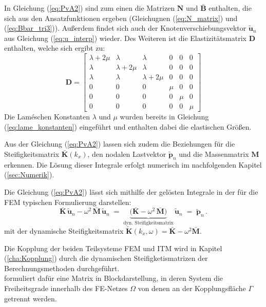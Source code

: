 In Gleichung (\ref{eq:PvA2}) sind zum einen die Matrizen $\mathbf{N}$ und $\bar{\mathbf B}$ enthalten, die sich aus den Ansatzfunktionen ergeben (Gleichugnen (\ref{eq:N_matrix}) und (\ref{eq:Bbar_tri3})). 
Außerdem findet sich auch der Knotenverschiebungsvektor $\tilde{\bm u}_{n}$ aus Gleichung (\ref{eq:u_interp}) wieder.
Des Weiteren ist die Elastizitätsmatrix $\mathbf{D}$ enthalten, welche sich ergibt zu:
\begin{equation}\label{eq:Elastizitätsmatrix}
	\mathbf D =
	\begin{bmatrix}
		\lambda+2\mu & \lambda      & \lambda      & 0 & 0 & 0 \\
		\lambda      & \lambda+2\mu & \lambda      & 0 & 0 & 0 \\
		\lambda      & \lambda      & \lambda+2\mu & 0 & 0 & 0 \\
		0            & 0            & 0            & \mu & 0   & 0 \\
		0            & 0            & 0            & 0   & \mu & 0 \\
		0            & 0            & 0            & 0   & 0   & \mu
	\end{bmatrix}
\end{equation}
Die Laméschen Konstanten $\lambda$ und $\mu$ wurden bereits in Gleichung (\ref{eq:lame_konstanten}) eingeführt und enthalten dabei die elastischen Größen.


Aus der Gleichung (\ref{eq:PvA2}) lassen sich zudem die Beziehungen für die Steifigkeitsmatrix \(\bar{\mathbf{K}}(k_x)\), den nodalen Lastvektor $\tilde{\mathbf p}_{n}$ und die Massenmatrix \(\mathbf{M}\) erkennen. 
Die Lösung dieser Integrale erfolgt numerisch im nachfolgenden Kapitel (\ref{sec:Numerik}).

Die Gleichung (\ref{eq:PvA2}) lässt sich mithilfe der gelösten Integrale in der für die FEM typischen Formulierung darstellen:
\begin{equation}\label{eq:PvA_FEM}
	\bar{\mathbf K}\,\tilde{\mathbf u}_{n}
	- \omega^{2}\,\bar{\mathbf M}\,\tilde{\mathbf u}_{n}
	\;=\;
	\underbrace{\bigl(\bar{\mathbf K}-\omega^{2}\,\bar{\mathbf M}\bigr)}_{\text{dyn.\ Steifigkeitsmatrix}}\,
	\tilde{\mathbf u}_{n}
	\;=\; \tilde{\mathbf p}_{n}\,.
\end{equation}
mit der dynamische Steifigkeitsmatrix $\tilde{\mathbf K}(k_x,\omega)=\bar{\mathbf K}-\omega^{2}\bar{\mathbf M}$.


Die Kopplung der beiden Teilsysteme FEM und ITM wird in Kapitel (\ref{cha:Kopplung}) durch die dynamischen Steifigketismatrizen der Berechnungsmethoden durchgeführt. \\
\cite{Hackenberg2016} formuliert dafür eine Matrix in Blockdarstellung, in deren System die Freiheitsgrade innerhalb des FE-Netzes $\Omega$ von denen an der Kopplungsfläche $\Gamma$ getrennt werden.

